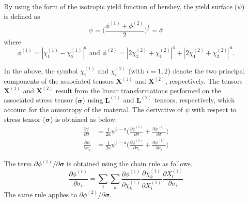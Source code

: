 \documentclass[12pt]{amsart}
\begin{document}
By using the form of the isotropic yield function of hershey, the yield surface ($\psi$) is defined as
\begin{equation}
  \label{eq:hershey}
  \psi=\bigg(\frac{\phi^{(1)} + \phi^{(2)}}{2}\bigg)^{\frac{1}{a}}=\bar{\sigma}
\end{equation}
where
\begin{equation}
  \label{eq:hershey2}
  \phi^{(1)} = |\chi^{(1)}_1-\chi^{(1)}_2|^a \text{ and } \phi^{(2)}=|2\chi^{(2)}_2+\chi^{(2)}_1|^a+|2\chi^{(2)}_1+\chi^{(2)}_2|^a.
\end{equation}

In the above, the symbol $\chi^{(1)}_i$ and $\chi^{(2)}_i$ (with $i=1,2$) denote the two principal components of the associated tensors $\mathbf{X}^{(1)}$ and $\mathbf{X}^{(2)}$, respectively.
The tensors $\mathbf{X}^{(1)}$ and $\mathbf{X}^{(2)}$ result from the linear transformations performed on the associated stress tensor ($\mathbf{\sigma}$) using $\mathbf{L}^{(1)}$ and $\mathbf{L}^{(2)}$ tensors, respectively, which account for the anisotropy of the material.
The derivative of $\psi$ with respect to stress tensor ($\mathbf{\sigma}$) is obtained as below:
\begin{equation}
  \label{eq:derivative1}
  \begin{split}
    \frac{\partial\psi}{\partial\sigma}&=\frac{1}{2a}\psi^{1-a}\bigg(\frac{\partial\phi^{(1)}}{\partial\sigma}+\frac{\partial\phi^{(2)}}{\partial\sigma}\bigg)\\
    \frac{\partial\psi}{\partial\sigma_i}&=\frac{1}{2a}\psi^{1-a}\bigg(\frac{\partial\phi^{(1)}}{\partial\sigma_i}+\frac{\partial\phi^{(2)}}{\partial\sigma_i}\bigg)
  \end{split}
\end{equation}

The term $\partial\phi^{(1)}/\partial\mathbf{\sigma}$ is obtained using the chain rule as follows.
\begin{equation}
  \label{eq:derivative1_1}
  \frac{\partial\phi^{(1)}}{\partial\sigma_i}=\sum_{l}\sum_{k} \frac{\partial\phi^{(1)}}{\partial\chi^{(1)}_k}  \frac{\partial\chi^{(1)}_k}{\partial X^{(1)}_l}   \frac{\partial X^{(1)}_l}{\partial\sigma_i}
\end{equation}
The same rule applies to $\partial\phi^{(2)}/\partial\mathbf{\sigma}$.
\end{document}
